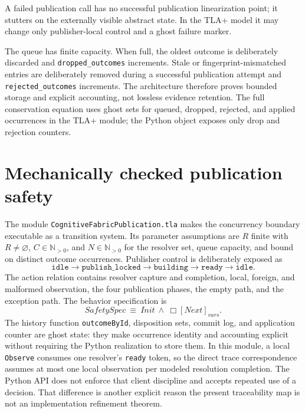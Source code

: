 \documentclass[11pt]{article}
\theoremstyle{definition}
\theoremstyle{plain}
\begin{document}
A failed publication call has no successful publication linearization point;
it stutters on the externally visible abstract state.  In the TLA+ model it may
change only publisher-local control and a ghost failure marker.

The queue has finite capacity.  When full, the oldest outcome is deliberately
discarded and \texttt{dropped\_outcomes} increments.  Stale or
fingerprint-mismatched entries are deliberately removed during a successful
publication attempt and \texttt{rejected\_outcomes} increments.  The
architecture therefore proves bounded storage and explicit accounting, not
lossless evidence retention.  The full conservation equation uses ghost sets
for queued, dropped, rejected, and applied occurrences in the TLA+ module; the
Python object exposes only drop and rejection counters.

\section{Mechanically checked publication safety}
\label{sec:mechanized}

The module \texttt{CognitiveFabricPublication.tla} makes the concurrency
boundary executable as a transition system.  Its parameter assumptions are
$R$ finite with $R\ne\varnothing$, $C\in\mathbb N_{>0}$, and
$N\in\mathbb N_{>0}$ for the resolver set, queue capacity, and bound on
distinct outcome occurrences.  Publisher control is deliberately exposed as
\[
\texttt{idle}\to\texttt{publish\_locked}\to
\texttt{building}\to\texttt{ready}\to\texttt{idle}.
\]
The action relation contains resolver capture and completion, local, foreign,
and malformed observation, the four publication phases, the empty path, and
the exception path.  The behavior specification is
\[
\mathit{SafetySpec}\ \equiv\ Init\ \land\ \Box[Next]_{\mathit{vars}}.
\]
The history function \texttt{outcomeById}, disposition sets, commit log, and
application counter are ghost state: they make occurrence identity and
accounting explicit without requiring the Python realization to store them.
In this module, a local \texttt{Observe} consumes one resolver's
\texttt{ready} token, so the direct trace correspondence assumes at most one
local observation per modeled resolution completion.  The Python API does not
enforce that client discipline and accepts repeated use of a decision.  That
difference is another explicit reason the present traceability map is not an
implementation refinement theorem.
\end{document}
